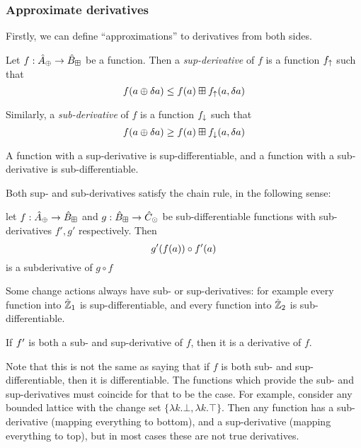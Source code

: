 \subsubsection{Approximate derivatives}

Firstly, we can define ``approximations'' to derivatives from both sides.

\begin{defn}
  Let $f: \hat{A}_\oplus \rightarrow \hat{B}_\boxplus$ be a function. Then a \textit{sup-derivative}
  of $f$ is a function $f_\uparrow$ such that
  $$f(a \oplus \delta a) \leq f(a) \boxplus f_\uparrow(a, \delta a)$$
  
  Similarly, a \textit{sub-derivative} of $f$ is a function $f_\downarrow$ such that 
  $$f(a \oplus \delta a) \geq f(a) \boxplus f_\downarrow(a, \delta a)$$

  A function with a sup-derivative is sup-differentiable, and a function with a
  sub-derivative is sub-differentiable.
\end{defn}

Both sup- and sub-derivatives satisfy the chain rule, in the following sense: 
\begin{prop}
  let $f : \hat{A}_\oplus \rightarrow \hat{B}_\boxplus$ and $g : \hat{B}_\boxplus \rightarrow \hat{C}_\odot$ be
  sub-differentiable functions with sub-derivatives $f', g'$ respectively. Then
  $$g'(f(a)) \circ f'(a)$$ is a subderivative of $g \circ f$
\end{prop}

Some change actions always have sub- or sup-derivatives: for example every function
into $\hat{\mathbb{Z}}_1$ is sup-differentiable, and every function into $\hat{\mathbb{Z}}_2$ is 
sub-differentiable.

\begin{prop}
  If $f'$ is both a sub- and sup-derivative of $f$, then it is a derivative of $f$.
\end{prop}

Note that this is not the same as saying that if $f$ is both sub- and
sup-differentiable, then it is differentiable. The functions which provide the
sub- and sup-derivatives must coincide for that to be the case. For example,
consider any bounded lattice with the change set $\{ \lambda k . \bot, \lambda k
 . \top \}$. Then any function has a sub-derivative (mapping everything to
 bottom), and a sup-derivative (mapping everything to top), but in most cases
 these are not true derivatives.

